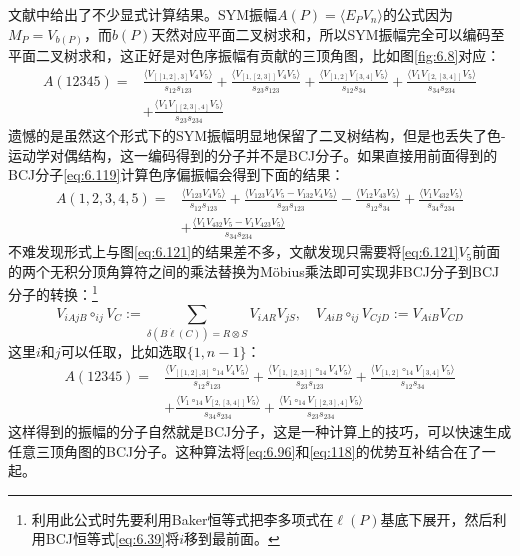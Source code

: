 文献\cite{Mafra:2011kj}中给出了不少显式计算结果。SYM振幅$A(P) = \langle E_P V_n \rangle$的公式因为$M_P=V_{b(P)}$，而$b(P)$天然对应平面二叉树求和，所以SYM振幅完全可以编码至平面二叉树求和，这正好是对色序振幅有贡献的三顶角图，比如图\ref{fig:6.8}对应：
\begin{equation}
	\label{eq:6.121}
\begin{aligned}
		A(12345)=&\frac{\langle V_{[[1,2],3]}V_4V_5\rangle}{s_{12}s_{123}}+\frac{\langle V_{[1,[2,3]]}V_4V_5\rangle}{s_{23}s_{123}}+\frac{\langle V_{[1,2]}V_{[3,4]}V_5\rangle}{s_{12}s_{34}}+\frac{\langle V_1V_{[2,[3,4]]}V_5\rangle}{s_{34}s_{234}}\\
		&+\frac{\langle V_1V_{[[2,3],4]}V_5\rangle}{s_{23}s_{234}}
\end{aligned}
\end{equation}
遗憾的是虽然这个形式下的SYM振幅明显地保留了二叉树结构，但是也丢失了色-运动学对偶结构，这一编码得到的分子并不是BCJ分子。如果直接用前面得到的BCJ分子\ref{eq:6.119}计算色序偏振幅会得到下面的结果：
\begin{equation}
\begin{aligned}
		A(1,2,3,4,5)=&\frac{\langle V_{123}V_4V_5\rangle}{s_{12}s_{123}}+\frac{\langle V_{123}V_4V_5-V_{132}V_4V_5\rangle}{s_{23}s_{123}}-\frac{\langle V_{12}V_{43}V_5\rangle}{s_{12}s_{34}}+\frac{\langle V_1V_{432}V_5\rangle}{s_{34}s_{234}}\\
		&+\frac{\langle V_1V_{432}V_5-V_1V_{423}V_5\rangle}{s_{34}s_{234}}
\end{aligned}
\end{equation}
不难发现形式上与图\ref{eq:6.121}的结果差不多，文献\cite{Mafra:2016ltu}发现只需要将\ref{eq:6.121}$V_5$前面的两个无积分顶角算符之间的乘法替换为M\"{o}bius乘法即可实现非BCJ分子到BCJ分子的转换：\footnote{利用此公式时先要利用Baker恒等式把李多项式在$\ell(P)$基底下展开，然后利用BCJ恒等式\ref{eq:6.39}将$i$移到最前面。}
\begin{equation}
	V_{iAjB}\circ_{ij}V_C:=\sum_{\delta(B\dot{\ell}(C))=R\otimes S}V_{iAR}V_{jS},\quad V_{AiB}\circ_{ij}V_{CjD}:=V_{AiB}V_{CD}
\end{equation}
这里$i$和$j$可以任取，比如选取$\{1,n-1\}$：
\begin{equation}
\begin{aligned}
		A(12345)=&\frac{\langle V_{[[1,2],3]}\circ_{14}V_4V_5\rangle}{s_{12}s_{123}}+\frac{\langle V_{[1,[2,3]]}\circ_{14}V_4V_5\rangle}{s_{23}s_{123}}+\frac{\langle V_{[1,2]}\circ_{14}V_{[3,4]}V_5\rangle}{s_{12}s_{34}}\\
		&+\frac{\langle V_1\circ_{14}V_{[2,[3,4]]}V_5\rangle}{s_{34}s_{234}}+\frac{\langle V_1\circ_{14}V_{[[2,3],4]}V_5\rangle}{s_{23}s_{234}}
\end{aligned}
\end{equation}
这样得到的振幅的分子自然就是BCJ分子，这是一种计算上的技巧，可以快速生成任意三顶角图的BCJ分子。这种算法将\ref{eq:6.96}和\ref{eq:118}的优势互补结合在了一起。